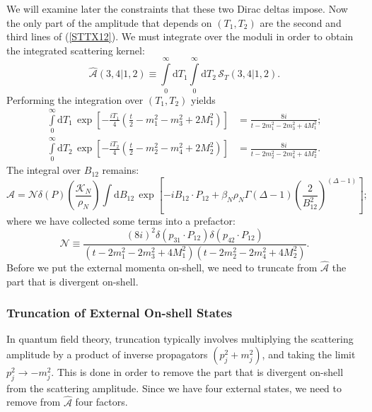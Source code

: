 We will examine later the constraints that these two Dirac deltas impose. Now the only part of the amplitude that depends on $(T_{1}, T_{2})$ are the second and third lines of (\ref{STTX12}). We must integrate over the moduli in order to obtain the integrated scattering kernel:
\begin{equation}
	\widehat{\mathcal{A}}(3, 4| 1, 2) \equiv \int\limits_{0}^{\infty} \mathrm{d}T_{1} \int\limits_{0}^{\infty} \mathrm{d}T_{2} \, \mathcal{S}_{T}(3, 4| 1, 2).
\end{equation}
Performing the integration over $(T_{1}, T_{2})$ yields
\begin{align}
	\int\limits_{0}^{\infty} \mathrm{d}T_{1} \, \exp{\left[ -\frac{i T_{1}}{4} \left( \frac{t}{2} - m_{1}^{2} - m_{3}^{2} + 2 M_{1}^{2}\right) \right]} &= \frac{8i}{t - 2m_{1}^{2} - 2m_{3}^{2} + 4 M_{1}^{2}}; \\
	\int\limits_{0}^{\infty} \mathrm{d}T_{2} \, \exp{\left[ -\frac{i T_{2}}{4} \left( \frac{t}{2} - m_{2}^{2} - m_{4}^{2} + 2 M_{2}^{2}\right) \right]} &= \frac{8i}{t - 2m_{2}^{2} - 2m_{4}^{2} + 4 M_{2}^{2}}.
\end{align}
The integral over $B_{12}$ remains:
\begin{equation}
	\widehat{\mathcal{A}} = \mathcal{N} \delta(P) \left( \frac{\mathcal{K}_{N}}{\rho_{N}} \right) \int \mathrm{d}B_{12} \, \exp{\left[-i B_{12} \cdot P_{12} + \beta_{N} \rho_{N} \Gamma(\Delta - 1) \left( \frac{2}{B_{1 2}^{2}} \right)^{(\Delta - 1)} \right]}; \label{AHatN}
\end{equation}
where we have collected some terms into a prefactor:
\begin{equation}
	\mathcal{N} \equiv \frac{(8i)^{2} \delta(p_{31} \cdot P_{12}) \delta(p_{42} \cdot P_{12})}{(t - 2m_{1}^{2} - 2m_{3}^{2} + 4 M_{1}^{2})(t - 2m_{2}^{2} - 2m_{4}^{2} + 4 M_{2}^{2})}.
\end{equation}
Before we put the external momenta on-shell, we need to truncate from $\widehat{\mathcal{A}}$ the part that is divergent on-shell.
\subsubsection{Truncation of External On-shell States}
In quantum field theory, truncation typically involves multiplying the scattering amplitude by a product of inverse propagators $(p_{j}^{2} + m_{j}^{2})$, and taking the limit $p_{j}^{2} \rightarrow - m_{j}^{2}$. This is done in order to remove the part that is divergent on-shell from the scattering amplitude. Since we have four external states, we need to remove from $\widehat{\mathcal{A}}$ four factors.

